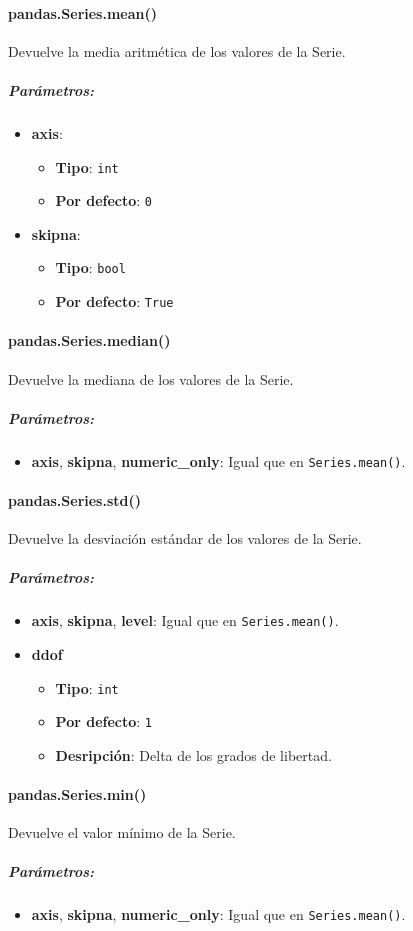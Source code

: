 \paragraph{pandas.Series.mean()} Devuelve la media aritmética de los valores de la Serie.
\subparagraph{Parámetros:}
\begin{itemize}
\item \textbf{axis}: 
\begin{itemize}
\item \textbf{Tipo}: \texttt{int}
\item \textbf{Por defecto}: \texttt{0}
\end{itemize}
\item \textbf{skipna}:
\begin{itemize}
\item \textbf{Tipo}: \texttt{bool}
\item \textbf{Por defecto}: \texttt{True}
\end{itemize}
\end{itemize}
\paragraph{pandas.Series.median()} Devuelve la mediana de los valores de la Serie.
\subparagraph{Parámetros:}
\begin{itemize}
\item \textbf{axis}, \textbf{skipna}, \textbf{numeric\_only}: Igual que en \texttt{Series.mean()}.
\end{itemize}
\paragraph{pandas.Series.std()} Devuelve la desviación estándar de los valores de la Serie.
\subparagraph{Parámetros:}
\begin{itemize}
\item \textbf{axis}, \textbf{skipna}, \textbf{level}: Igual que en \texttt{Series.mean()}.
\item \textbf{ddof}
\begin{itemize}
\item \textbf{Tipo}: \texttt{int}
\item \textbf{Por defecto}: \texttt{1}
\item \textbf{Desripción}: Delta de los grados de libertad. 
\end{itemize}
\end{itemize}
\paragraph{pandas.Series.min()} Devuelve el valor mínimo de la Serie.
\subparagraph{Parámetros:}
\begin{itemize}
\item \textbf{axis}, \textbf{skipna}, \textbf{numeric\_only}: Igual que en \texttt{Series.mean()}.
\end{itemize}
